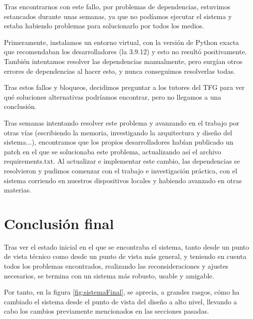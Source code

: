 Tras encontrarnos con este fallo, por problemas de dependencias, estuvimos estancados durante unas semanas, ya que no podíamos ejecutar el sistema y estaba habiendo problemas para solucionarlo por todos los medios.

Primeramente, instalamos un entorno virtual, con la versión de Python exacta que recomendaban los desarrolladores (la 3.9.12) y esto no resultó positivamente. También intentamos resolver las dependencias manualmente, pero surgían otros errores de dependencias al hacer esto, y nunca conseguimos resolverlas todas.

Tras estos fallos y bloqueos, decidimos preguntar a los tutores del TFG para ver qué soluciones alternativas podríamos encontrar, pero no llegamos a una conclusión. 

Tras semanas intentando resolver este problema y avanzando en el trabajo por otras vías (escribiendo la memoria, investigando la arquitectura y diseño del sistema...), encontramos que los propios desarrolladores habían publicado un patch en el que se solucionaba este problema, actualizando así el archivo requirements.txt. Al actualizar e implementar este cambio, las dependencias se resolvieron y pudimos comenzar con el trabajo e investigación práctica, con el sistema corriendo en nuestros dispositivos locales y habiendo avanzado en otras materias.

\section{Conclusión final}

Tras ver el estado inicial en el que se encontraba el sistema, tanto desde un punto de vista técnico como desde un punto de vista más general, y teniendo en cuenta todos los problemas encontrados, realizando las reconsideraciones y ajustes necesarios, se termina con un sistema más robusto, usable y amigable.

Por tanto, en la figura \ref{fig:sistemaFinal}, se aprecia, a grandes rasgos, cómo ha cambiado el sistema desde el punto de vista del diseño a alto nivel, llevando a cabo los cambios previamente mencionados en las secciones pasadas.

